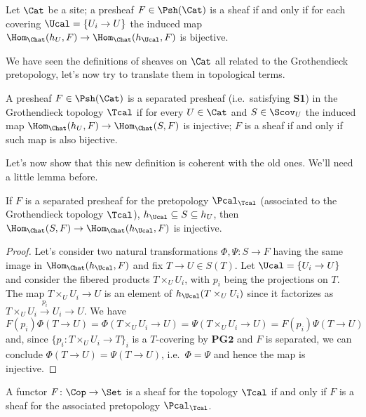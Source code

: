 \documentclass[a4paper]{article}
\begin{document}
         \begin{corollary}
             \label{corollary:sheaf_bijection_top}
             Let $\Cat$ be a site; a presheaf $F \in \Psh(\Cat)$ is a sheaf if and only if for each covering $\Ucal = \{U_i \to U\}$ the induced map $\Hom_{\Chat}(h_U, F) \to \Hom_{\Chat}(h_{\Ucal}, F)$ is bijective.
         \end{corollary}

         We have seen the definitions of sheaves on $\Cat$ all related to the Grothendieck pretopology, let's now try to translate them in topological terms.
         \begin{defn}
             \label{defn:sheaves_top}
             A presheaf $F \in \Psh(\Cat)$ is a separated presheaf (i.e.\ satisfying \textbf{S1}) in the Grothendieck topology $\Tcal$ if for every $U \in \Cat$ and $S \in \Scov_U$ the induced map $\Hom_{\Chat}(h_U, F) \to \Hom_{\Chat}(S, F)$ is injective; $F$ is a sheaf if and only if such map is also bijective.
         \end{defn}
         Let's now show that this new definition is coherent with the old ones. We'll need a little lemma before.
         \begin{lemma}
             \label{lemma:separated_presheaf_top}
             If $F$ is a separated presheaf for the pretopology $\Pcal_{\Tcal}$ (associated to the Grothendieck topology $\Tcal$), $h_{\Ucal} \subseteq S \subseteq h_U$, then $\Hom_{\Chat}(S, F) \to \Hom_{\Chat}(h_{\Ucal}, F)$ is injective.
         \end{lemma}
         \begin{proof}
             Let's consider two natural transformations $\Phi, \Psi\colon S \to F$ having the same image in $\Hom_{\Chat}(h_{\Ucal}, F)$ and fix $T \to U \in S(T)$. Let $\Ucal = \{U_i \to U\}$ and consider the fibered products $T \times_U U_i$, with $p_i$ being the projections on $T$. The map $T \times_U U_i \to U$ is an element of $h_{\Ucal}(T \times_U U_i)$ since it factorizes as $T \times_U U_i \stackrel{p_i}{\to} U_i \to U$. We have \[F(p_i)\Phi(T \to U) = \Phi(T \times_U U_i \to U) = \Psi(T \times_U U_i \to U) = F(p_i)\Psi(T \to U) \] and, since $\{p_i\colon T \times_U U_i \to T\}_i$ is a $T$-covering by $\mathbf{PG2}$ and $F$ is separated, we can conclude $\Phi(T \to U) = \Psi(T \to U)$, i.e.\ $\Phi = \Psi$ and hence the map is injective.
         \end{proof}
         \begin{prop}
             A functor $F\colon \Cop \to \Set$ is a sheaf for the topology $\Tcal$ if and only if $F$ is a sheaf for the associated pretopology $\Pcal_{\Tcal}$.
         \end{prop}
\end{document}
